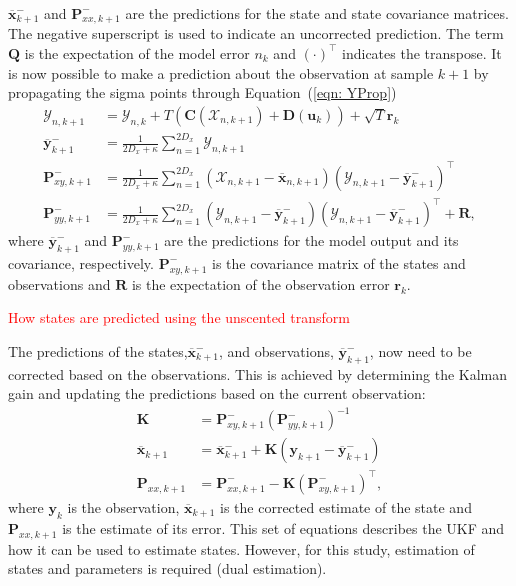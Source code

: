 \documentclass{article}%
\newcommand\red{\textcolor{red}}
\begin{document}
\begin{align}
\end{align} $\overline{\mathbf{x}}_{k+1}^{-}$ and $\mathbf{P}_{xx,k+1}^{-}$ are the predictions for the state and state covariance matrices. The negative superscript is used to indicate an uncorrected prediction. The term $\mathbf{Q}$ is the expectation of the model error $n_{k}$ and $(\cdot)^{\top}$ indicates the transpose. It is now possible to make a prediction about the observation at sample $k+1$ by propagating the sigma points through Equation~(\ref{eqn: YProp}) \begin{align} %
\mathbf{\mathcal{Y}}_{n,k+1} &= \mathbf{\mathcal{Y}}_{n,k} + T(\mathbf{C}(\mathbf{\mathcal{X}}_{n,k+1})+ \mathbf{D}(\mathbf{u}_{k}))+ \sqrt{T}\mathbf{r}_{k}\\
\overline{\mathbf{y}}_{k+1}^{-} &= \frac{1}{2D_{x}+\kappa}\sum_{n=1}^{2D_{x}} \mathbf{\mathcal{Y}}_{n,k+1}\\
\label{eqn: statecovg}
\mathbf{P}_{xy,k+1}^{-} &= \frac{1}{2D_{x}+\kappa}\sum_{n=1}^{2D_{x}} (\mathbf{\mathcal{X}}_{n,k+1}-\overline{\mathbf{x}}_{n,k+1}) (\mathbf{\mathcal{Y}}_{n,k+1}-\overline{\mathbf{y}}_{k+1}^{-})^{\top}\\
\mathbf{P}_{yy,k+1}^{-} &= \frac{1}{2D_{x}+\kappa}\sum_{n=1}^{2D_{x}} (\mathbf{\mathcal{Y}}_{n,k+1}-\overline{\mathbf{y}}_{k+1}^{-}) (\mathbf{\mathcal{Y}}_{n,k+1}-\overline{\mathbf{y}}_{k+1}^{-})^{\top} +\mathbf{R},%
\end{align} where $\overline{\mathbf{y}}_{k+1}^{-}$ and $\mathbf{P}_{yy,k+1}^{-}$ are the predictions for the model output and its covariance, respectively. $\mathbf{P}_{xy,k+1}^{-}$ is the covariance matrix of the states and observations and $\mathbf{R}$ is the expectation of the observation error $\mathbf{r}_{k}$.


\red{How states are predicted using the unscented transform}

The predictions of the states,$\overline{\mathbf{x}}_{k+1}^{-}$, and observations, $\overline{\mathbf{y}}_{k+1}^{-}$, now need to be corrected based on the observations. This is achieved by determining the Kalman gain and updating the predictions based on the current observation: \begin{align}
\mathbf{K} &= \mathbf{P}_{xy,k+1}^{-}(\mathbf{P}_{yy,k+1}^{-})^{-1}\\
\overline{\mathbf{x}}_{k+1} &= \overline{\mathbf{x}}_{k+1}^{-} + \mathbf{K}(\mathbf{y}_{k+1}-\overline{\mathbf{y}}_{k+1}^{-})\\
\mathbf{P}_{xx,k+1} &= \mathbf{P}_{xx,k+1}^{-} - \mathbf{K}(\mathbf{P}_{xy,k+1}^{-})^{\top},
\end{align} where $\mathbf{y}_{k}$ is the observation, $\overline{\mathbf{x}}_{k+1}$ is the corrected estimate of the state and $\mathbf{P}_{xx,k+1}$ is the estimate of its error. This set of equations describes the UKF and how it can be used to estimate states. However, for this study, estimation of states and parameters is required (dual estimation).
\end{document}
